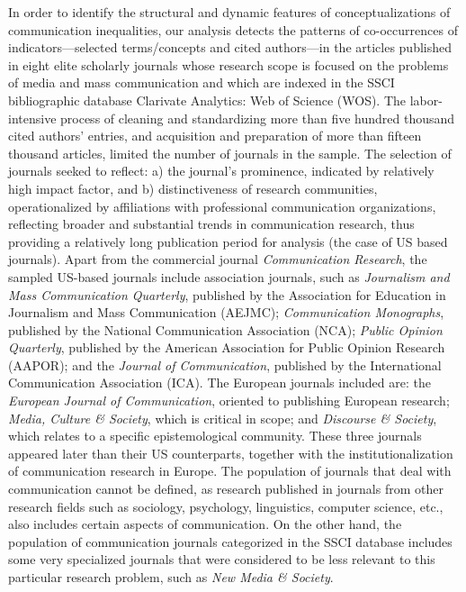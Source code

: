 \documentclass{tufte-handout}
\begin{document}
In order to identify the structural and dynamic features of
conceptualizations of communication inequalities, our analysis detects
the patterns of co-occurrences of indicators---selected terms/concepts
and cited authors---in the articles published in eight elite scholarly
journals whose research scope is focused on the problems of media and
mass communication and which are indexed in the SSCI bibliographic
database Clarivate Analytics: Web of Science (WOS). The labor-intensive
process of cleaning and standardizing more than five hundred thousand
cited authors' entries, and acquisition and preparation of more than
fifteen thousand articles, limited the number of journals in the sample.
The selection of journals seeked to reflect: a) the journal's
prominence, indicated by relatively high impact factor, and b)
distinctiveness of research communities, operationalized by affiliations
with professional communication organizations, reflecting broader and
substantial trends in communication research, thus providing a
relatively long publication period for analysis (the case of US based
journals). Apart from the commercial journal \emph{Communication
Research}, the sampled US-based journals include association journals,
such as \emph{Journalism and Mass Communication Quarterly}, published by
the Association for Education in Journalism and Mass Communication
(AEJMC); \emph{Communication Monographs}, published by the National
Communication Association (NCA); \emph{Public Opinion Quarterly},
published by the American Association for Public Opinion Research
(AAPOR); and the \emph{Journal of Communication}, published by the
International Communication Association (ICA). The European journals
included are: the \emph{European Journal of Communication}, oriented to
publishing European research; \emph{Media, Culture \& Society}, which is
critical in scope; and \emph{Discourse \& Society}, which relates to a
specific epistemological community. These three journals appeared later
than their US counterparts, together with the institutionalization of
communication research in Europe. The population of journals that deal
with communication cannot be defined, as research published in journals
from other research fields such as sociology, psychology, linguistics,
computer science, etc., also includes certain aspects of communication.
On the other hand, the population of communication journals categorized
in the SSCI database includes some very specialized journals that were
considered to be less relevant to this particular research problem, such
as \emph{New Media \& Society}.
\end{document}
